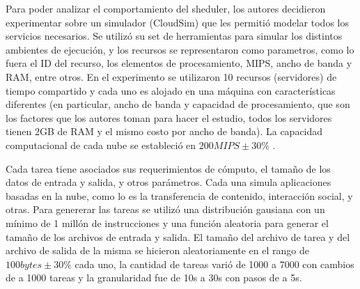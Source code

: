 Para poder analizar el comportamiento del sheduler, los autores decidieron experimentar sobre un simulador (CloudSim) que les permitió modelar todos los servicios necesarios. Se utilizó su set de herramientas para simular los distintos ambientes de ejecución, y los recursos se representaron como parametros, como lo fuera el ID del recurso, los elementos de procesamiento, MIPS,  ancho de banda y RAM, entre otros. 
En el experimento se utilizaron 10 recursos (servidores) de tiempo compartido y cada uno es alojado en una máquina con características diferentes (en particular, ancho de banda y capacidad de procesamiento, que son los factores que los autores toman para hacer el estudio, todos los servidores tienen 2GB de RAM y el mismo costo por ancho de banda). La capacidad computacional de cada nube se estableció en $200 MIPS \pm 30\%$ .

Cada tarea tiene asociados sus requerimientos de cómputo, el tamaño de los datos de entrada y salida, y otros parámetros. Cada una simula aplicaciones basadas en la nube, como lo es la transferencia de contenido, interacción social, y otras. Para genererar las tareas se utilizó una distribución gausiana con un mínimo de 1 millón de instrucciones y una función aleatoria para generar el tamaño de los archivos de entrada y salida. El tamaño del archivo de tarea y del archivo de salida de la misma se hicieron aleatoriamente en el rango de $100 bytes \pm 30\%$  cada uno, la cantidad de tareas varió de 1000 a 7000 con cambios de a 1000 tareas y la granularidad fue de 10s a 30s con pasos de a 5s.